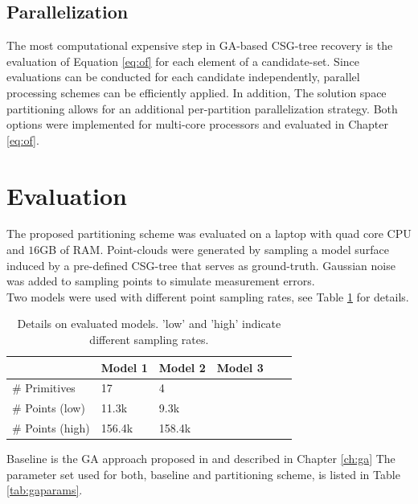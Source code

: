 \subsection{Parallelization}
The most computational expensive step in \ac{GA}-based \ac{CSG}-tree recovery is the evaluation of Equation \ref{eq:of} for each element of a candidate-set. 
Since evaluations can be conducted for each candidate independently, parallel processing schemes can be efficiently applied.  
In addition, The solution space partitioning allows for an additional per-partition parallelization strategy.
Both options were implemented for multi-core processors and evaluated in Chapter \ref{eq:of}.

\section{Evaluation}
\label{ch:eval}
The proposed partitioning scheme was evaluated on a laptop with quad core CPU and $16$GB of RAM.
Point-clouds were generated by sampling a model surface induced by a pre-defined \ac{CSG}-tree that serves as ground-truth. Gaussian noise was added to sampling points to simulate measurement errors.
\\
Two models were used with different point sampling rates, see Table \ref{tab::models} for details. 
\begin{table}[h]
	\centering
	\begin{tabular}{|l|l|l|l|l|l|}
	\hline
	& \textbf{Model 1} & \textbf{Model 2} & \textbf{Model 3}  \\
	\hline
	\# Primitives & 17 & 4 &\\
	\hline
	\# Points (low) & 11.3k & 9.3k &\\
	\hline
	\# Points (high) & 156.4k & 158.4k &\\
	\hline
	\end{tabular}
	\caption{Details on evaluated models. 'low' and 'high' indicate different sampling rates.}
	\label{tab::models}
\end{table}
Baseline is the \ac{GA} approach proposed in \cite{fayolle2016evolutionary} and described in Chapter \ref{ch:ga} The parameter set used for both, baseline and partitioning scheme, is listed in Table \ref{tab:gaparams}.

